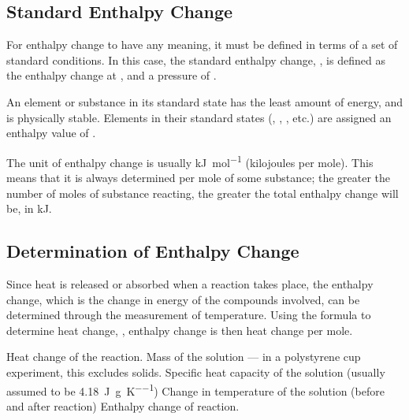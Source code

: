 
		\subsection{Standard Enthalpy Change}

			For enthalpy change to have any meaning, it must be defined in terms of a set of standard conditions. In this case, the standard
			enthalpy change, \enthStd{}, is defined as the enthalpy change at , and a pressure of .

			An element or substance in its standard state has the least amount of energy, and is physically stable. Elements in their standard
			states (, , , etc.) are assigned an enthalpy value of .

			The unit of enthalpy change is usually \si{\kilo\joule\per\mole} (kilojoules per mole). This means that it is always determined
			per mole of some substance; the greater the number of moles of substance reacting, the greater the total enthalpy change will be,
			in \si{\kilo\joule}.


		\subsection{Determination of Enthalpy Change}

			Since heat is released or absorbed when a reaction takes place, the enthalpy change, which is the change in energy of the compounds
			involved, can be determined through the measurement of temperature. Using the formula to determine heat change, , enthalpy change
			is then heat change per mole.


			\parbox{\textwidth}{
				\tabto{0mm}\tabto{15mm}     Heat change of the reaction.
				\tabto{0mm}\tabto{15mm}     Mass of the solution — in a polystyrene cup experiment, this excludes solids.
				\tabto{0mm}\tabto{15mm}     Specific heat capacity of the solution (usually assumed to be \SI{4.18}{\joule\per\gram\per\kelvin})
				\tabto{0mm}\tabto{15mm}    Change in temperature of the solution (before and after reaction)
				\tabto{0mm}\tabto{15mm}    Enthalpy change of reaction.
			}


